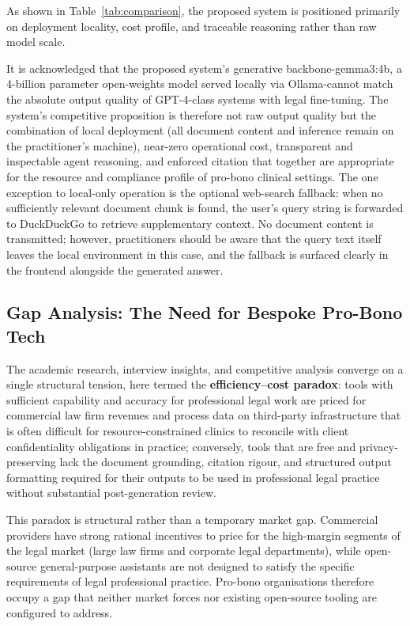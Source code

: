 \documentclass[11pt,a4paper]{article}
\begin{document}
As shown in Table~\ref{tab:comparison}, the proposed system is positioned primarily on deployment locality, cost profile, and traceable reasoning rather than raw model scale.

\noindent It is acknowledged that the proposed system's generative backbone-gemma3:4b, a 4-billion parameter open-weights model served locally via Ollama-cannot match the absolute output quality of GPT-4-class systems with legal fine-tuning. The system's
competitive proposition is therefore not raw output quality but the combination of local
deployment (all document content and inference remain on the practitioner's machine), near-zero operational cost,
transparent and inspectable agent reasoning, and enforced citation that together are
appropriate for the resource and compliance profile of pro-bono clinical settings.
The one exception to local-only operation is the optional web-search fallback: when no
sufficiently relevant document chunk is found, the user's query string is forwarded to
DuckDuckGo to retrieve supplementary context.  No document content is transmitted;
however, practitioners should be aware that the query text itself leaves the local
environment in this case, and the fallback is surfaced clearly in the frontend alongside
the generated answer.

\subsection{Gap Analysis: The Need for Bespoke Pro-Bono Tech}

The academic research, interview insights, and competitive analysis converge on a single structural tension, here
termed the \textbf{efficiency--cost paradox}: tools with sufficient capability and accuracy
for professional legal work are priced for commercial law firm revenues and process data on
third-party infrastructure that is often difficult for resource-constrained clinics to reconcile
with client confidentiality obligations in practice; conversely,
tools that are free and privacy-preserving lack the document grounding, citation rigour, and
structured output formatting required for their outputs to be used in professional legal
practice without substantial post-generation review.

This paradox is structural rather than a temporary market gap. Commercial providers have
strong rational incentives to price for the high-margin segments of the legal market (large
law firms and corporate legal departments), while open-source general-purpose assistants are
not designed to satisfy the specific requirements of legal professional practice. Pro-bono
organisations therefore occupy a gap that neither market forces nor existing open-source
tooling are configured to address.
\end{document}
